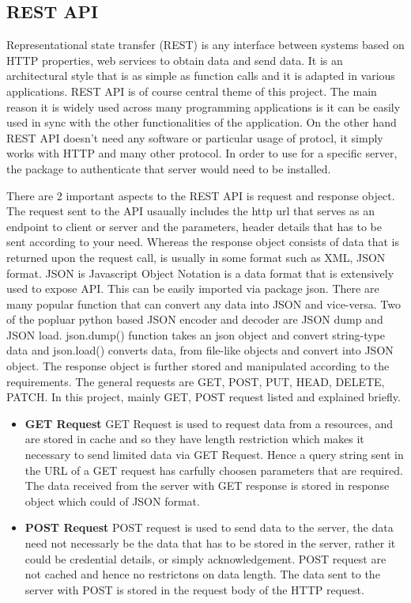 \subsection{REST API}

Representational state transfer (REST) is any interface between
systems based on HTTP properties, web services to obtain data and send
data. It is an architectural style that is as simple as function calls
and it is adapted in various applications. REST API is of course
central theme of this project. The main reason it is widely used
across many programming applications is it can be easily used in sync
with the other functionalities of the application. On the other hand
REST API doesn't need any software or particular usage of protocl, it
simply works with HTTP and many other protocol. In order to use for a
specific server, the package to authenticate that server would need to
be installed.

There are 2 important aspects to the REST API is request and response
object. The request sent to the API usaually includes the http url
that serves as an endpoint to client or server and the parameters,
header details that has to be sent according to your need. Whereas the
response object consists of data that is returned upon the request
call, is usually in some format such as XML, JSON format. JSON is
Javascript Object Notation is a data format that is extensively used
to expose API. This can be easily imported via package json. There are
many popular function that can convert any data into JSON and
vice-versa. Two of the popluar python based JSON encoder and decoder
are JSON dump and JSON load. json.dump() function takes an json object
and convert string-type data and json.load() converts data, from
file-like objects and convert into JSON object. The response object is
further stored and manipulated according to the requirements. The
general requests are GET, POST, PUT, HEAD, DELETE, PATCH. In this
project, mainly GET, POST request listed and explained briefly.

\begin{itemize}
\item \textbf{GET Request} GET Request is used to request data from a
  resources, and are stored in cache and so they have length
  restriction which makes it necessary to send limited data via GET
  Request. Hence a query string sent in the URL of a GET request has
  carfully choosen parameters that are required. The data received
  from the server with GET response is stored in response object which
  could of JSON format.
  
\item \textbf{POST Request} POST request is used to send data to the
  server, the data need not necessarly be the data that has to be
  stored in the server, rather it could be credential details, or
  simply acknowledgement. POST request are not cached and hence no
  restrictons on data length. The data sent to the server with POST is
  stored in the request body of the HTTP request.
  
\end{itemize}

